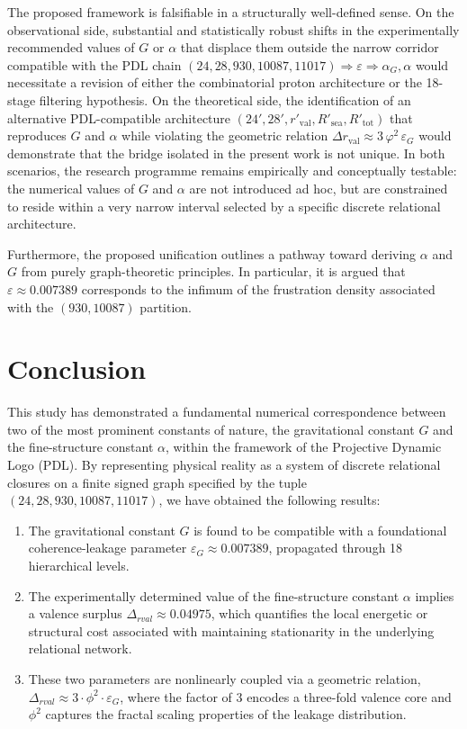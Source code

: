 \documentclass[11pt,a4paper]{article}
\begin{document}
The proposed framework is falsifiable in a structurally well-defined sense.
On the observational side, substantial and statistically robust shifts in the experimentally recommended values of \(G\) or \(\alpha\) that displace them outside the narrow corridor compatible with the PDL chain \((24, 28, 930, 10087, 11017)
\Rightarrow \varepsilon \Rightarrow \alpha_G, \alpha\) would necessitate a revision of either the combinatorial proton architecture or the 18-stage filtering hypothesis.
On the theoretical side, the identification of an alternative PDL-compatible architecture \((24', 28', r'_{\text{val}}, R'_{\text{sea}}, R'_{\text{tot}})\)
that reproduces \(G\) and \(\alpha\) while violating the geometric relation
\(\Delta r_{\text{val}} \approx 3\,\varphi^2\,\varepsilon_G\) would demonstrate that the bridge isolated in the present work is not unique.
In both scenarios, the research programme remains empirically and conceptually testable: the numerical values of
\(G\) and \(\alpha\) are not introduced ad hoc, but are constrained to reside within a very narrow interval selected by a specific discrete relational architecture. \cite{Combinatorial_Proton_v2_2026}

Furthermore, the proposed unification outlines a pathway toward deriving \(\alpha\) and \(G\) from purely graph-theoretic principles. In particular, it is argued that \(\varepsilon \approx 0.007389\) corresponds to the infimum of the frustration density associated with the \((930, 10087)\) partition. \cite{Effective_Fields_PDL_2026, PDL_Global_Mapping_2026}

\section{Conclusion}

This study has demonstrated a fundamental numerical correspondence between two of the most prominent constants of nature, the gravitational constant \(G\) and the fine-structure constant \(\alpha\), within the framework of the Projective Dynamic Logo (PDL). By representing physical reality as a system of discrete relational closures on a finite signed graph specified by the tuple \((24, 28, 930, 10087, 11017)\), we have obtained the following results:

\begin{enumerate}
    \item The gravitational constant \(G\) is found to be compatible with a foundational coherence-leakage parameter \(\varepsilon_G \approx 0.007389\), propagated through 18 hierarchical levels.
    \item The experimentally determined value of the fine-structure constant \(\alpha\) implies a valence surplus \(\Delta_{rval} \approx 0.04975\), which quantifies the local energetic or structural cost associated with maintaining stationarity in the underlying relational network.
    \item These two parameters are nonlinearly coupled via a geometric relation, \(\Delta_{rval} \approx 3 \cdot \phi^2 \cdot \varepsilon_G\), where the factor of 3 encodes a three-fold valence core and \(\phi^2\) captures the fractal scaling properties of the leakage distribution.
\end{enumerate}
\end{document}
